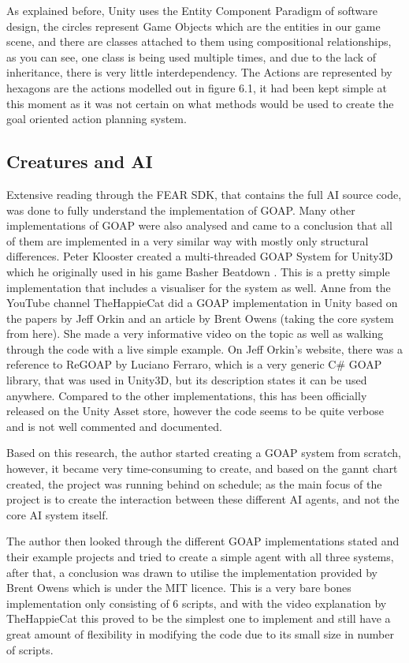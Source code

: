 \documentclass[11pt]{report}
\begin{document}
As explained before, Unity uses the Entity Component Paradigm of software design, the circles represent Game Objects which are the entities in our game scene, and there are classes attached to them using compositional relationships, as you can see, one class is being used multiple times, and due to the lack of inheritance, there is very little interdependency. 
The Actions are represented by hexagons are the actions modelled out in figure 6.1, it had been kept simple at this moment as it was not certain on what methods would be used to create the goal oriented action planning system.

\subsection{Creatures and AI}
Extensive reading through the FEAR SDK\cite{fearSDK}, that contains the full AI source code, was done to fully understand the implementation of GOAP.
Many other implementations of GOAP were also analysed and came to a conclusion that all of them are implemented in a very similar way with mostly only structural differences. 
Peter Klooster created a multi-threaded GOAP System for Unity3D which he originally used in his game Basher Beatdown \cite{basherGoap}. This is a pretty simple implementation that includes a visualiser for the system as well.
Anne from the YouTube channel TheHappieCat did a GOAP implementation in Unity \cite{happieGoapVideo} based on the papers by Jeff Orkin and an article by Brent Owens \cite{brentOwensGoap} (taking the core system from here). She made a very informative video on the topic as well as walking through the code with a live simple example.
On Jeff Orkin's website, there was a reference to ReGOAP by Luciano Ferraro, which is a very generic C\# GOAP library, that was used in Unity3D, but its description states it can be used anywhere. Compared to the other implementations, this has been officially released on the Unity Asset store, however the code seems to be quite verbose and is not well commented and documented.

Based on this research, the author started creating a GOAP system from scratch, however, it became very time-consuming to create, and based on the gannt chart created, the project was running behind on schedule; as the main focus of the project is to create the interaction between these different AI agents, and not the core AI system itself.

The author then looked through the different GOAP implementations stated and their example projects and tried to create a simple agent with all three systems, after that, a conclusion was drawn to utilise the implementation provided by Brent Owens \cite{brentOwensGoapCode} which is under the MIT licence. This is a very bare bones implementation only consisting of 6 scripts, and with the video explanation by TheHappieCat this proved to be the simplest one to implement and still have a great amount of flexibility in modifying the code due to its small size in number of scripts.
\end{document}
